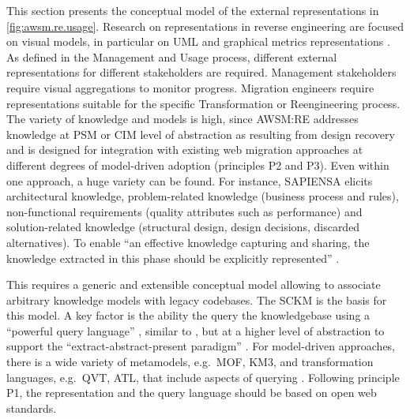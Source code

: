 This section presents the conceptual model of the external representations in \cref{fig:awsm.re.usage}.
Research on representations in reverse engineering are focused on visual models, in particular on UML and graphical metrics representations \autocite{Canfora2007ReverseEngineering}.
As defined in the Management and Usage process, different external representations for different stakeholders are required.
Management stakeholders require visual aggregations to monitor progress.
Migration engineers require representations suitable for the specific Transformation or Reengineering process.
The variety of knowledge and models is high, since AWSM:RE addresses knowledge at PSM or CIM level of abstraction as resulting from design recovery and is designed for integration with existing web migration approaches at different degrees of model-driven adoption (principles P2 and P3).
Even within one approach, a huge variety can be found.
For instance, SAPIENSA \autocite{Razavian2010SAPIENSA} elicits architectural knowledge, problem-related knowledge (business process and rules), non-functional requirements (quality attributes such as performance) and solution-related knowledge (structural design, design decisions, discarded alternatives).
To enable ``an effective knowledge capturing and sharing,
the knowledge extracted in this phase should be explicitly represented'' \autocite{Razavian2010SAPIENSA}.

This requires a generic and extensible conceptual model allowing to associate arbitrary knowledge models with legacy codebases.
The SCKM is the basis for this model.
A key factor is the ability the query the knowledgebase using a ``powerful query language'' \autocite{Tilley1996ProgramUnderstanding}, similar to \autocite{Paul1996CodeQuery,Mendelzon1995}, but at a higher level of abstraction to support the ``extract-abstract-present paradigm'' \autocite{Khadka2011ServiciFi}.
For model-driven approaches, there is a wide variety of metamodels, e.g.~MOF, KM3, and transformation languages, e.g.~QVT, ATL, that include aspects of querying \autocite{Fuhr2013SOAMIG}.
Following principle P1, the representation and the query language should be based on open web standards.

